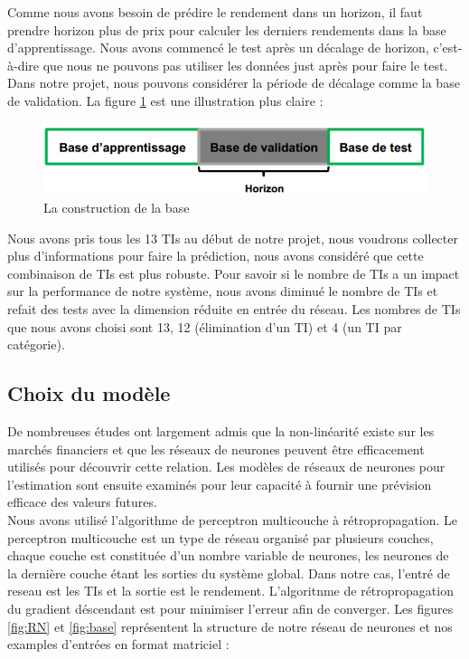 Comme nous avons besoin de prédire le rendement dans un horizon, il faut prendre horizon plus de prix pour calculer les derniers rendements dans la base d'apprentissage. Nous avons commencé le test après un décalage de horizon, c'est-à-dire que nous ne pouvons pas utiliser les données just après pour faire le test. Dans notre projet, nous pouvons considérer la période de décalage comme la base de validation. La figure \ref{fig:BA} est une illustration plus claire : \\

\begin{figure}[H]
	\centering
	\includegraphics[width=.5\linewidth, scale=0.2]
	{plot/BA.png}
	\caption{La construction de la base}
	\label{fig:BA}
\end{figure}

Nous avons pris tous les 13 TIs au début de notre projet, nous voudrons collecter plus d’informations pour faire la prédiction, nous avons considéré que cette combinaison de TIs est plus robuste. Pour savoir si le nombre de TIs a un impact sur la performance de notre système, nous avons diminué le nombre de TIs et refait des tests avec la dimension réduite en entrée du réseau. Les nombres de TIs que nous avons choisi sont 13, 12 (élimination d'un TI) et 4 (un TI par catégorie).

\subsection{Choix du modèle}

De nombreuses études ont largement admis que la non-linéarité existe sur les marchés financiers et que les réseaux de neurones peuvent être efficacement utilisés pour découvrir cette relation. Les modèles de réseaux de neurones pour l'estimation sont ensuite examinés pour leur capacité à fournir une prévision efficace des valeurs futures.\\

Nous avons utilisé l'algorithme de perceptron multicouche à rétropropagation. Le perceptron multicouche est un type de réseau organisé par plusieurs couches, chaque couche est constituée d'un nombre variable de neurones, les neurones de la dernière couche étant les sorties du système global. Dans notre cas, l'entré de reseau est les TIs et la sortie est le rendement. L'algoritnme de rétropropagation du gradient déscendant est pour minimiser l'erreur afin de converger. Les figures \ref{fig:RN} et \ref{fig:base} représentent la structure de notre réseau de neurones et nos examples d'entrées en format matriciel :\\

